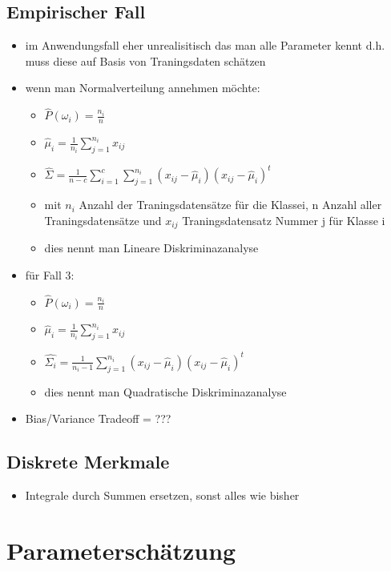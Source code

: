 \documentclass{article} %
\begin{document}
	\subsection{Empirischer Fall}
	\begin{itemize}
		\item im Anwendungsfall eher unrealisitisch das man alle Parameter kennt d.h. muss diese auf Basis von Traningsdaten schätzen
		\item wenn man Normalverteilung annehmen möchte:
		\begin{itemize}
			\item $\hat{P}(\omega_i) = \frac{n_i}{n}$
			\item $\hat{\mu}_i = \frac{1}{n_i}\sum_{j=1}^{n_i} x_{ij}$
			\item $\hat{\Sigma} = \frac{1}{n-c}\sum_{i=1}^{c}\sum_{j=1}^{n_i}(x_{ij}-\hat{\mu}_i)(x_{ij}-\hat{\mu}_i)^t$
			\item mit $n_i$ Anzahl der Traningsdatensätze für die Klassei, n Anzahl aller Traningsdatensätze und $x_{ij}$ Traningsdatensatz Nummer j für Klasse i
			\item dies nennt man Lineare Diskriminazanalyse
		\end{itemize}
		\item für Fall 3:
		\begin{itemize}
			\item $\hat{P}(\omega_i) = \frac{n_i}{n}$
			\item $\hat{\mu}_i = \frac{1}{n_i}\sum_{j=1}^{n_i} x_{ij}$
			\item $\hat{\Sigma_i} = \frac{1}{n_i-1}\sum_{j=1}^{n_i}(x_{ij}-\hat{\mu}_i)(x_{ij}-\hat{\mu}_i)^t$
			\item dies nennt man Quadratische Diskriminazanalyse
		\end{itemize}
		\item Bias/Variance Tradeoff = ???
	\end{itemize}
	\subsection{Diskrete Merkmale}
	\begin{itemize}
		\item Integrale durch Summen ersetzen, sonst alles wie bisher
	\end{itemize}
\section{Parameterschätzung}
\end{document}
